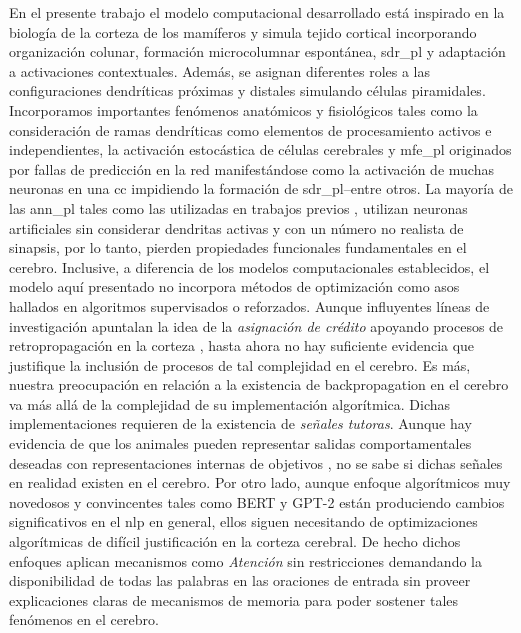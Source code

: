 {En el presente trabajo el modelo computacional desarrollado está inspirado en la biología de la corteza de los mamíferos y simula tejido cortical incorporando organización colunar, formación microcolumnar espontánea, \gls{sdr_pl} y adaptación a activaciones contextuales.
Además, se asignan diferentes roles a las configuraciones dendríticas próximas y distales simulando células piramidales.
Incorporamos importantes fenómenos anatómicos y fisiológicos tales como la consideración de ramas dendríticas como elementos de procesamiento activos e independientes, la activación estocástica de células cerebrales y \gls{mfe_pl} originados por fallas de predicción en la red manifestándose como la activación de muchas neuronas en una \gls{cc} impidiendo la formación de \gls{sdr_pl}--entre otros.
La mayoría de las \gls{ann_pl} tales como las utilizadas en trabajos previos \cite{STJOHN1990217, rabovsky_modelling_2018, Dominey2009NeuralNP, michalon_meaning-driven_2019}, utilizan neuronas artificiales sin considerar dendritas activas y con un número no realista de sinapsis, por lo tanto, pierden propiedades funcionales fundamentales en el cerebro.
Inclusive, a diferencia de los modelos computacionales establecidos, el modelo aquí presentado no incorpora métodos de optimización como asos hallados en algoritmos supervisados o reforzados.
Aunque influyentes líneas de investigación apuntalan la idea de la \emph{asignación de crédito} apoyando procesos de retropropagación en la corteza \cite{10.7554/eLife.22901}, hasta ahora no hay suficiente evidencia que justifique la inclusión de procesos de tal complejidad en el cerebro.
Es más, nuestra preocupación en relación a la existencia de backpropagation en el cerebro va más allá de la complejidad de su implementación algorítmica.
Dichas implementaciones requieren de la existencia de \emph{señales tutoras}.
Aunque hay evidencia de que los animales pueden representar salidas comportamentales deseadas con representaciones internas de objetivos \cite{gadagkar_dopamine_2016}, no se sabe si dichas señales en realidad existen en el cerebro.
Por otro lado, aunque enfoque algorítmicos muy novedosos y convincentes tales como BERT \cite{DBLP:journals/corr/abs-1810-04805} y GPT-2 \cite{radford_language_nodate, DBLP:journals/corr/VaswaniSPUJGKP17} están produciendo cambios significativos en el \gls{nlp} en general, ellos siguen necesitando de optimizaciones algorítmicas de difícil justificación en la corteza cerebral.
De hecho dichos enfoques aplican mecanismos como \emph{Atención} sin restricciones demandando la disponibilidad de todas las palabras en las oraciones de entrada sin proveer explicaciones claras de mecanismos de memoria para poder sostener tales fenómenos en el cerebro.

}
